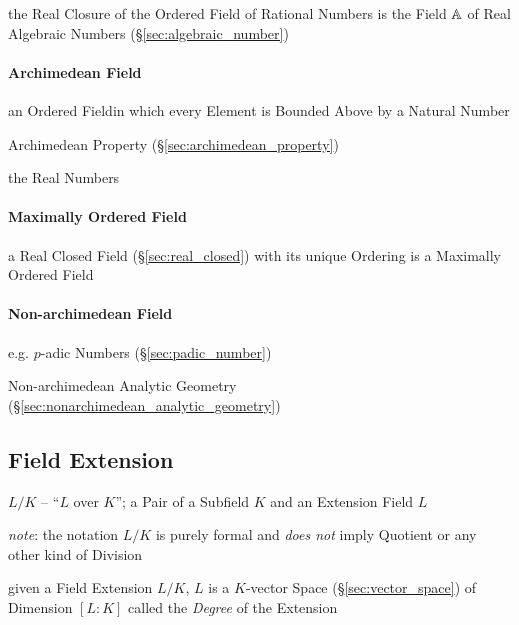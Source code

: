 the Real Closure of the Ordered Field of Rational Numbers is the Field $\mathbb{A}$
of Real Algebraic Numbers (\S\ref{sec:algebraic_number})



\paragraph{Archimedean Field}\label{sec:archimedean_field}\hfill

an Ordered Fieldin which every Element is Bounded Above by a Natural Number

Archimedean Property (\S\ref{sec:archimedean_property})

the Real Numbers



\paragraph{Maximally Ordered Field}\label{sec:maximally_ordered_field}\hfill

a Real Closed Field (\S\ref{sec:real_closed}) with its unique Ordering is a
Maximally Ordered Field



\paragraph{Non-archimedean Field}\label{sec:nonarchimedean_field}\hfill

e.g. $p$-adic Numbers (\S\ref{sec:padic_number})

\fist Non-archimedean Analytic Geometry
(\S\ref{sec:nonarchimedean_analytic_geometry})



\subsection{Field Extension}\label{sec:field_extension}

$L/K$ -- ``$L$ over $K$''; a Pair of a Subfield $K$ and an Extension Field $L$

\emph{note}: the notation $L/K$ is purely formal and \emph{does not} imply
Quotient or any other kind of Division

given a Field Extension $L/K$, $L$ is a $K$-vector Space
(\S\ref{sec:vector_space}) of Dimension $[L:K]$ called the \emph{Degree} of
the Extension

